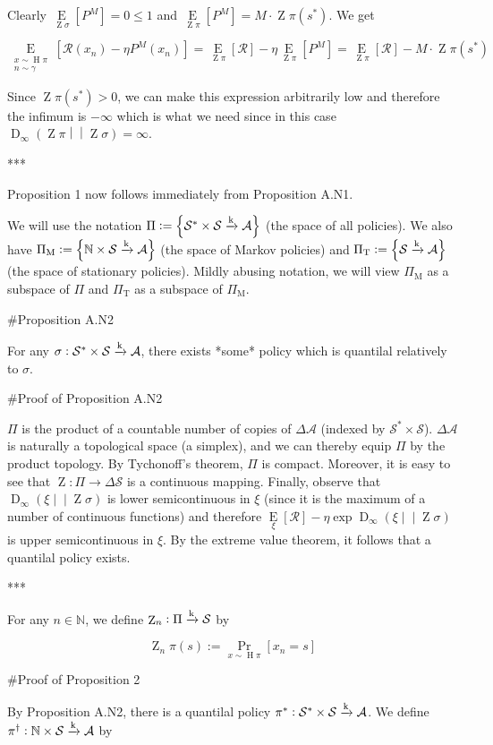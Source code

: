 \documentclass[a4paper]{article}
\newcommand{\AP}[1]{\left(#1\right)}
\newcommand{\AB}[1]{\left[#1\right]}
\newcommand{\AC}[1]{\left\{#1\right\}}
\newcommand{\Pa}[2]{\underset{#1}{\operatorname{Pr}}\AB{#2}}
\newcommand{\Ea}[2]{\underset{#1}{\operatorname{E}}\AB{#2}}
\newcommand{\RD}[3]{\operatorname{D}_{#1}\AP{#2\middle\vert\middle\vert#3}}
\newcommand{\Nats}{\mathbb{N}}
\newcommand{\K}{\xrightarrow{\textnormal{k}}}
\newcommand{\A}{\mathcal{A}}
\newcommand{\St}{\mathcal{S}}
\newcommand{\R}{\mathcal{R}}
\newcommand{\Pe}{P}
\DeclareMathOperator{\Hi}{H}
\DeclareMathOperator{\Z}{Z}
\begin{document}
Clearly $\Ea{\Z{\sigma}}{\Pe^M} = 0 \leq 1$ and $\Ea{\Z{\pi}}{P^M} = M \cdot \Z{\pi}\AP{s^*}$. We get

$$\Ea{\substack{x\sim\Hi{\pi}\\n\sim\gamma}}{\R\AP{x_n}-\eta\Pe^M\AP{x_n}} = \Ea{\Z{\pi}}{\R} - \eta \Ea{\Z{\pi}}{\Pe^M} = \Ea{\Z{\pi}}{\R} - M \cdot \Z{\pi}\AP{s^*}$$

Since $\Z{\pi}\AP{s^*} > 0$, we can make this expression arbitrarily low and therefore the infimum is $-\infty$ which is what we need since in this case $\RD{\infty}{\Z{\pi}}{\Z{\sigma}} = \infty$.

***

Proposition 1 now follows immediately from Proposition A.N1.

We will use the notation $\Pi:=\AC{\St^* \times \St \K \A}$ (the space of all policies). We also have $\Pi_{\text{M}}:=\AC{\Nats \times \St \K \A}$ (the space of Markov policies) and $\Pi_{\text{T}}:=\AC{ \St \K \A}$ (the space of stationary policies). Mildly abusing notation, we will view $\Pi_{\text{M}}$ as a subspace of $\Pi$ and $\Pi_{\text{T}}$ as a subspace of $\Pi_{\text{M}}$.

\#Proposition A.N2

For any $\sigma: \St^* \times \St \K \A$, there exists *some* policy which is quantilal relatively to $\sigma$.

\#Proof of Proposition A.N2

$\Pi$ is the product of a countable number of copies of $\Delta\A$ (indexed by $\St^* \times \St$). $\Delta\A$ is naturally a topological space (a simplex), and we can thereby equip $\Pi$ by the product topology. By Tychonoff's theorem, $\Pi$ is compact. Moreover, it is easy to see that $\Z: \Pi \rightarrow \Delta\St$ is a continuous mapping. Finally, observe that $\RD{\infty}{\xi}{\Z{\sigma}}$ is lower semicontinuous in $\xi$ (since it is the maximum of a number of continuous functions) and therefore $\Ea{\xi}{\R} - \eta\exp{\RD{\infty}{\xi}{\Z{\sigma}}}$ is upper semicontinuous in $\xi$. By the extreme value theorem, it follows that a quantilal policy exists.

***

For any $n\in\Nats$, we define $\Z_n: \Pi \K \St$ by 

$$\Z_n{\pi}(s) := \Pa{x\sim\Hi{\pi}}{x_n=s}$$

\#Proof of Proposition 2

By Proposition A.N2, there is a quantilal policy $\pi^*: \St^* \times \St \K \A$. We define $\pi^\dagger: \Nats \times \St \K \A$ by
\end{document}
